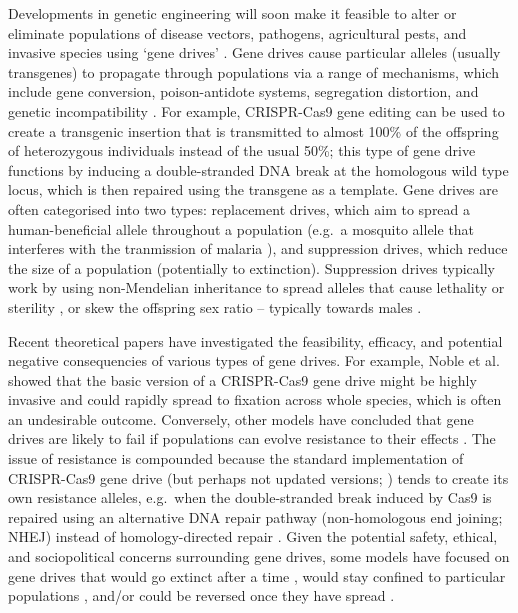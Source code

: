 \documentclass[]{rsos}%
\begin{document}
Developments in genetic engineering will soon make it feasible to alter
or eliminate populations of disease vectors, pathogens, agricultural
pests, and invasive species using `gene drives'
\citep{gantz2015hi, hammond2016cr, wang2016cr, prowse2017do, kyrou2018cr, noble2018cu}.
Gene drives cause particular alleles (usually transgenes) to propagate
through populations via a range of mechanisms, which include gene
conversion, poison-antidote systems, segregation distortion, and genetic
incompatibility \citep{lindholm2016ec, champer2016ch, oberhofer2019cl}.
For example, CRISPR-Cas9 gene editing can be used to create a transgenic
insertion that is transmitted to almost 100\% of the offspring of
heterozygous individuals instead of the usual 50\%; this type of gene
drive functions by inducing a double-stranded DNA break at the
homologous wild type locus, which is then repaired using the transgene
as a template. Gene drives are often categorised into two types:
replacement drives, which aim to spread a human-beneficial allele
throughout a population (e.g.~a mosquito allele that interferes with the
tranmission of malaria \citep{gantz2015hi, marshall2015gene}), and
suppression drives, which reduce the size of a population (potentially
to extinction). Suppression drives typically work by using non-Mendelian
inheritance to spread alleles that cause lethality or sterility
\citep{hammond2016cr, kyrou2018cr, maselko2018ge}, or skew the offspring
sex ratio -- typically towards males
\citep{windbichler2008ta, galizi2014sy, beaghton2017ve, burt2018se, papathanos2018re}.

Recent theoretical papers have investigated the feasibility, efficacy,
and potential negative consequencies of various types of gene drives.
For example, Noble et al. \citep{noble2018cu} showed that the basic
version of a CRISPR-Cas9 gene drive might be highly invasive and could
rapidly spread to fixation across whole species, which is often an
undesirable outcome. Conversely, other models have concluded that gene
drives are likely to fail if populations can evolve resistance to their
effects \citep{drury2017cr, unckless2017ev}. The issue of resistance is
compounded because the standard implementation of CRISPR-Cas9 gene drive
(but perhaps not updated versions;
\citep{esvelt2014em, unckless2017ev, prowse2017do, kyrou2018cr}) tends
to create its own resistance alleles, e.g.~when the double-stranded
break induced by Cas9 is repaired using an alternative DNA repair
pathway (non-homologous end joining; NHEJ) instead of homology-directed
repair
\citep{gantz2015mu, gantz2015hi, hammond2016cr, wang2016cr, unckless2017ev}.
Given the potential safety, ethical, and sociopolitical concerns
surrounding gene drives, some models have focused on gene drives that
would go extinct after a time
\citep{min2017da, burt2018se, noble2019da}, would stay confined to
particular populations \citep{maselko2018ge, noble2019da}, and/or could
be reversed once they have spread \citep{vella2017ev}.
\end{document}

